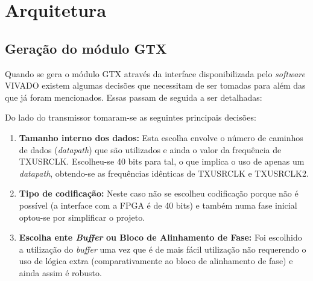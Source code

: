 \documentclass[11pt,a4paper]{article}
\begin{document}
	\section{Arquitetura}
	
	\subsection{Geração do módulo GTX}	

	Quando se gera o módulo GTX através da interface disponibilizada pelo \textit{software} VIVADO existem algumas decisões que necessitam de ser tomadas para além das que já foram mencionados. Essas passam de seguida a ser detalhadas:
	
	Do lado do transmissor tomaram-se as seguintes principais decisões:
	\begin{enumerate}
		\item \textbf{Tamanho interno dos dados:} Esta escolha envolve o número de caminhos de dados (\textit{datapath}) que são utilizados e ainda o valor da frequência de TXUSRCLK. Escolheu-se 40 bits para tal, o que implica o uso de apenas um \textit{datapath}, obtendo-se as frequências idênticas de TXUSRCLK e TXUSRCLK2.
		\item \textbf{Tipo de codificação:} Neste caso não se escolheu codificação porque não é possível (a interface com a FPGA é de 40 bits) e também numa fase inicial optou-se por simplificar o projeto.
		\item \textbf{Escolha ente \textit{Buffer} ou Bloco de Alinhamento de Fase:} Foi escolhido a utilização do \textit{buffer} uma vez que é de mais fácil utilização não requerendo o uso de lógica extra (comparativamente ao bloco de alinhamento de fase) e ainda assim é robusto.
	\end{enumerate}
	
\end{document}
